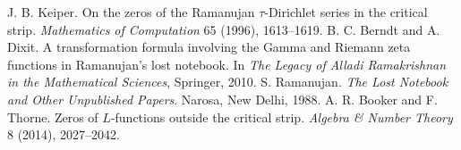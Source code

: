  J. B. Keiper. On the zeros of the Ramanujan $\tau$-Dirichlet series in the critical strip. \emph{Mathematics of Computation} 65 (1996), 1613--1619. %
 B. C. Berndt and A. Dixit. A transformation formula involving the Gamma and Riemann zeta functions in Ramanujan's lost notebook. In \emph{The Legacy of Alladi Ramakrishnan in the Mathematical Sciences}, Springer, 2010. %
 S. Ramanujan. \emph{The Lost Notebook and Other Unpublished Papers}. Narosa, New Delhi, 1988. %
 A. R. Booker and F. Thorne. Zeros of $L$-functions outside the critical strip. \emph{Algebra \& Number Theory} 8 (2014), 2027--2042. %
